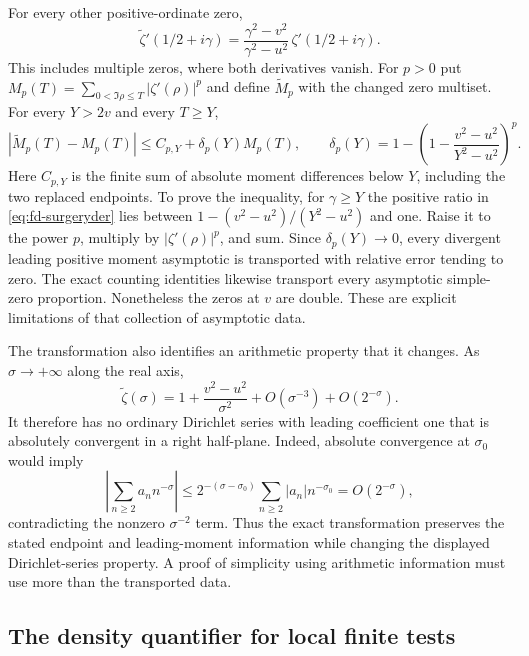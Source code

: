 For every other positive-ordinate zero,
\begin{equation}\label{eq:fd-surgeryder}
 \widetilde\zeta'(1/2+i\gamma)
  =\frac{\gamma^2-v^2}{\gamma^2-u^2}\,
                          \zeta'(1/2+i\gamma).
\end{equation}
This includes multiple zeros, where both derivatives vanish.
For $p>0$ put $M_p(T)=\sum_{0<\Im\rho\le T}|\zeta'(\rho)|^p$
and define $\widetilde M_p$ with the changed zero multiset.
For every $Y>2v$ and every $T\ge Y$,
\begin{equation}\label{eq:fd-momentsurgery}
 |\widetilde M_p(T)-M_p(T)|
 \le C_{p,Y}+\delta_p(Y)M_p(T),\qquad
 \delta_p(Y)=1-\left(1-\frac{v^2-u^2}{Y^2-u^2}\right)^p.
\end{equation}
Here $C_{p,Y}$ is the finite sum of absolute moment differences below
$Y$, including the two replaced endpoints.
To prove the inequality, for $\gamma\ge Y$ the positive ratio in
\eqref{eq:fd-surgeryder} lies between
$1-(v^2-u^2)/(Y^2-u^2)$ and one.
Raise it to the power $p$, multiply by $|\zeta'(\rho)|^p$, and
sum.  Since $\delta_p(Y)\to0$, every divergent leading positive
moment asymptotic is transported with relative error tending to zero.
The exact counting identities likewise transport every asymptotic
simple-zero proportion.  Nonetheless the zeros at $v$ are double.
These are explicit limitations of that collection of asymptotic data.

The transformation also identifies an arithmetic property that it changes.
As $\sigma\to+\infty$ along the real axis,
\[
 \widetilde\zeta(\sigma)
 =1+\frac{v^2-u^2}{\sigma^2}+O(\sigma^{-3})+O(2^{-\sigma}).
\]
It therefore has no ordinary Dirichlet series with leading coefficient
one that is absolutely convergent in a right half-plane.
Indeed, absolute convergence at $\sigma_0$ would imply
\[
 \left|\sum_{n\ge2}a_n n^{-\sigma}\right|
 \le2^{-(\sigma-\sigma_0)}
        \sum_{n\ge2}|a_n|n^{-\sigma_0}=O(2^{-\sigma}),
\]
contradicting the nonzero $\sigma^{-2}$ term.
Thus the exact transformation preserves the stated endpoint and
leading-moment information while changing the displayed Dirichlet-series
property.  A proof of simplicity using arithmetic information must use
more than the transported data.



\subsection{The density quantifier for local finite tests}

